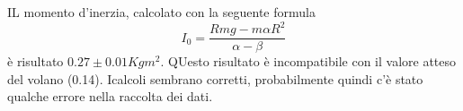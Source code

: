 IL momento d'inerzia, calcolato con la seguente formula \[I_0 = \frac{R m g - m \alpha R^{2}}{\alpha - \beta} \] è risultato $0.27 \pm 0.01 Kgm^2$. QUesto risultato
è incompatibile con il valore atteso del volano (0.14). Icalcoli sembrano
corretti, probabilmente quindi c'è stato qualche errore nella raccolta dei dati.
